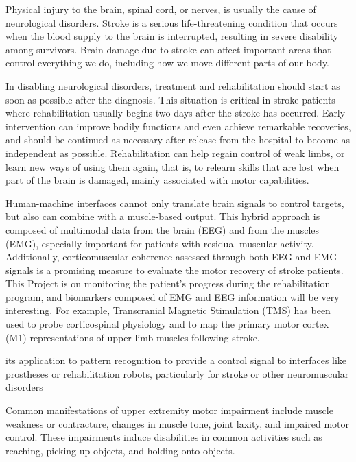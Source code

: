 Physical injury to the brain, spinal cord, or nerves, is usually the cause of neurological disorders.
Stroke is a serious life-threatening condition that occurs when the blood supply to the brain is interrupted, resulting in severe disability among survivors. Brain damage due to stroke can affect important areas that control everything we do, including how we move different parts of our body.

In disabling neurological disorders, treatment and rehabilitation should start as soon as possible after the diagnosis. This situation is critical in stroke patients where rehabilitation usually begins two days after the stroke has occurred. Early intervention can improve bodily functions and even achieve remarkable recoveries, and should be continued as necessary after release from the hospital to become as independent as possible. Rehabilitation can help regain control of weak limbs, or learn new ways of using them again, that is, to relearn skills that are lost when part of the brain is damaged, mainly associated with motor capabilities.

Human-machine interfaces cannot only translate brain signals to control targets, but also can combine with a muscle-based output. This hybrid approach is composed of multimodal data from the brain (EEG) and from the muscles (EMG), especially important for patients with residual muscular activity. Additionally, corticomuscular coherence assessed through both EEG and EMG signals is a promising measure to evaluate the motor recovery of stroke patients. This Project is on monitoring the patient's progress during the rehabilitation program, and biomarkers composed of EMG and EEG information will be very interesting. For example, Transcranial Magnetic Stimulation (TMS) has been used to probe corticospinal physiology and to map the primary motor cortex (M1) representations of upper limb muscles following stroke.

its application to pattern recognition to provide a control signal to interfaces like prostheses or rehabilitation robots, particularly for stroke or other neuromuscular disorders

Common manifestations of upper extremity motor impairment include muscle weakness or contracture, changes in muscle tone, joint laxity, and impaired motor control. These impairments induce disabilities in common activities such as reaching, picking up objects, and holding onto objects.

